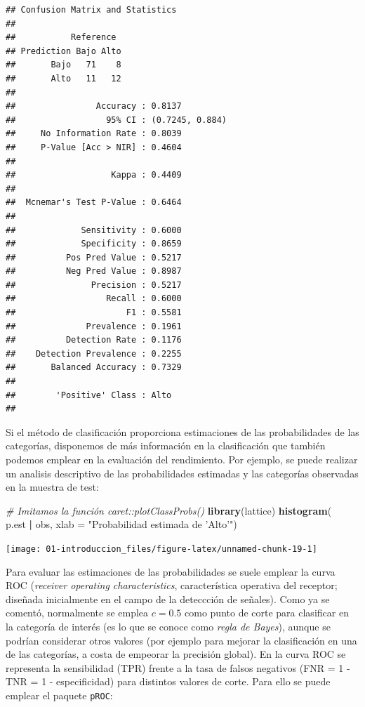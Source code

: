 \documentclass[]{book}
\newenvironment{Shaded}{\begin{snugshade}}{\end{snugshade}}
\newcommand{\KeywordTok}[1]{\textcolor[rgb]{0.13,0.29,0.53}{\textbf{#1}}}
\newcommand{\DataTypeTok}[1]{\textcolor[rgb]{0.13,0.29,0.53}{#1}}
\newcommand{\StringTok}[1]{\textcolor[rgb]{0.31,0.60,0.02}{#1}}
\newcommand{\CommentTok}[1]{\textcolor[rgb]{0.56,0.35,0.01}{\textit{#1}}}
\newcommand{\OperatorTok}[1]{\textcolor[rgb]{0.81,0.36,0.00}{\textbf{#1}}}
\newcommand{\NormalTok}[1]{#1}
\theoremstyle{break}
\theoremstyle{definition}
\theoremstyle{definition}
\theoremstyle{definition}
\theoremstyle{remark}
\begin{document}
\begin{verbatim}
## Confusion Matrix and Statistics
## 
##           Reference
## Prediction Bajo Alto
##       Bajo   71    8
##       Alto   11   12
##                                          
##                Accuracy : 0.8137         
##                  95% CI : (0.7245, 0.884)
##     No Information Rate : 0.8039         
##     P-Value [Acc > NIR] : 0.4604         
##                                          
##                   Kappa : 0.4409         
##                                          
##  Mcnemar's Test P-Value : 0.6464         
##                                          
##             Sensitivity : 0.6000         
##             Specificity : 0.8659         
##          Pos Pred Value : 0.5217         
##          Neg Pred Value : 0.8987         
##               Precision : 0.5217         
##                  Recall : 0.6000         
##                      F1 : 0.5581         
##              Prevalence : 0.1961         
##          Detection Rate : 0.1176         
##    Detection Prevalence : 0.2255         
##       Balanced Accuracy : 0.7329         
##                                          
##        'Positive' Class : Alto           
## 
\end{verbatim}

Si el método de clasificación proporciona estimaciones de las
probabilidades de las categorías, disponemos de más información en la
clasificación que también podemos emplear en la evaluación del
rendimiento. Por ejemplo, se puede realizar un analisis descriptivo de
las probabilidades estimadas y las categorías observadas en la muestra
de test:

\begin{Shaded}
\begin{Highlighting}[]
\CommentTok{# Imitamos la función caret::plotClassProbs()}
\KeywordTok{library}\NormalTok{(lattice) }
\KeywordTok{histogram}\NormalTok{(}\OperatorTok{~}\StringTok{ }\NormalTok{p.est }\OperatorTok{|}\StringTok{ }\NormalTok{obs, }\DataTypeTok{xlab =} \StringTok{"Probabilidad estimada de 'Alto'"}\NormalTok{)}
\end{Highlighting}
\end{Shaded}

\begin{center}\texttt{[image: 01-introduccion\_files/figure-latex/unnamed-chunk-19-1]} \end{center}

Para evaluar las estimaciones de las probabilidades se suele emplear la
curva ROC (\emph{receiver operating characteristics}, característica
operativa del receptor; diseñada inicialmente en el campo de la
deteccción de señales). Como ya se comentó, normalmente se emplea
\(c = 0.5\) como punto de corte para clasificar en la categoría de
interés (es lo que se conoce como \emph{regla de Bayes}), aunque se
podrían considerar otros valores (por ejemplo para mejorar la
clasificación en una de las categorías, a costa de empeorar la precisión
global). En la curva ROC se representa la sensibilidad (TPR) frente a la
tasa de falsos negativos (FNR = 1 - TNR = 1 - especificidad) para
distintos valores de corte. Para ello se puede emplear el paquete
\texttt{pROC}:
\end{document}
